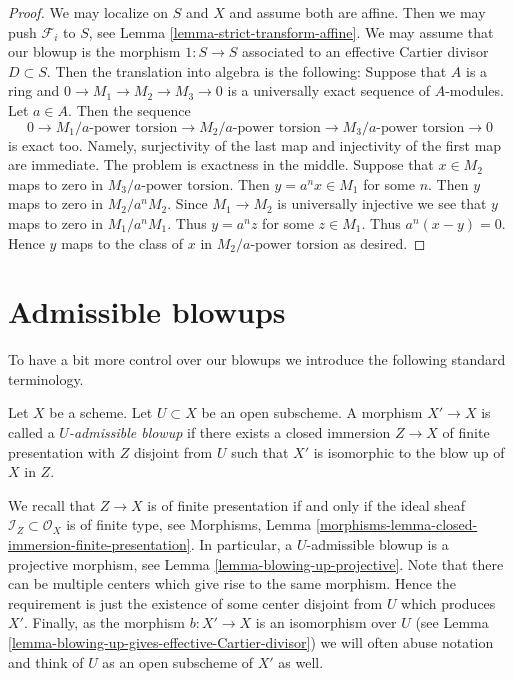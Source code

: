 \begin{proof}
We may localize on $S$ and $X$ and assume both are affine.
Then we may push $\mathcal{F}_i$ to $S$, see
Lemma \ref{lemma-strict-transform-affine}.
We may assume that our blowup is the morphism $1 : S \to S$
associated to an effective Cartier divisor $D \subset S$.
Then the translation into algebra is the following: Suppose that $A$
is a ring and $0 \to M_1 \to M_2 \to M_3 \to 0$ is a universally
exact sequence of $A$-modules. Let $a\in A$. Then the sequence
$$
0 \to
M_1/a\text{-power torsion} \to
M_2/a\text{-power torsion} \to
M_3/a\text{-power torsion} \to 0
$$
is exact too. Namely, surjectivity of the last map and injectivity of
the first map are immediate. The problem is exactness in the middle.
Suppose that $x \in M_2$ maps to zero in $M_3/a\text{-power torsion}$.
Then $y = a^n x \in M_1$ for some $n$. Then $y$ maps to zero in
$M_2/a^nM_2$. Since $M_1 \to M_2$ is universally injective we see that
$y$ maps to zero in $M_1/a^nM_1$. Thus $y = a^n z$ for some $z \in M_1$.
Thus $a^n(x - y) = 0$. Hence $y$ maps to the class of $x$ in
$M_2/a\text{-power torsion}$ as desired.
\end{proof}








\section{Admissible blowups}
\label{section-admissible-blowups}

\noindent
To have a bit more control over our blowups we introduce the following
standard terminology.

\begin{definition}
\label{definition-admissible-blowup}
Let $X$ be a scheme. Let $U \subset X$ be an open subscheme. A morphism
$X' \to X$ is called a {\it $U$-admissible blowup} if there exists a
closed immersion $Z \to X$ of finite presentation with $Z$ disjoint from
$U$ such that $X'$ is isomorphic to the blow up of $X$ in $Z$.
\end{definition}

\noindent
We recall that $Z \to X$ is of finite presentation if and only if the
ideal sheaf $\mathcal{I}_Z \subset \mathcal{O}_X$ is of finite type, see
Morphisms, Lemma \ref{morphisms-lemma-closed-immersion-finite-presentation}.
In particular, a $U$-admissible blowup is a projective morphism, see
Lemma \ref{lemma-blowing-up-projective}.
Note that there can be multiple centers which give rise to the same morphism.
Hence the requirement is just the existence of some center disjoint from
$U$ which produces $X'$.
Finally, as the morphism $b : X' \to X$ is an isomorphism over $U$ (see
Lemma \ref{lemma-blowing-up-gives-effective-Cartier-divisor}) we will often
abuse notation and think of $U$ as an open subscheme of $X'$ as well.


